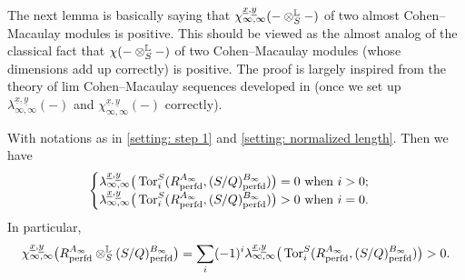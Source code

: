 \documentclass[12pt]{amsart}
\numberwithin{equation}{theorem}
\numberwithin{equation}{theorem}
\newcommand{\perfd}{\textnormal{perfd}}
\begin{document}
The next lemma is basically saying that $\chi_{\infty, \infty}^{\underline{x}, \underline{y}}(- \otimes_S^{\mathbb{L}} -)$ of two almost Cohen--Macaulay modules is positive. This should be viewed as the almost analog of the classical fact that $\chi(- \otimes^{\mathbb{L}}_S -)$ of two Cohen--Macaulay modules (whose dimensions add up correctly) is positive. The proof is largely inspired from the theory of lim Cohen--Macaulay sequences developed in \cite{BhattHochsterMaLimCM2026} (once we set up $\lambda_{\infty, \infty}^{\underline{x}, \underline{y}}(-)$ and $\chi_{\infty, \infty}^{\underline{x}, \underline{y}}(-)$ correctly).

\begin{lemma}
\label{lem: strict positivity}
With notations as in \autoref{setting: step 1} and \autoref{setting: normalized length}. Then we have 
$$
\begin{cases}
\lambda_{\infty, \infty}^{\underline{x}, \underline{y}}\big(\Tor_i^S(R^{A_\infty}_\perfd, (S/Q)^{B_\infty}_\perfd)\big)  =0 \text{ when $i>0$;}\\
\lambda_{\infty, \infty}^{\underline{x}, \underline{y}}\big(\Tor_i^S(R^{A_\infty}_\perfd, (S/Q)^{B_\infty}_\perfd)\big)  >0 \text{ when $i=0$.}
\end{cases}
$$
In particular,
$$\chi_{\infty, \infty}^{\underline{x}, \underline{y}}\big(R^{A_\infty}_\perfd \otimes^\myL_S(S/Q)^{B_\infty}_\perfd\big) = \sum_i(-1)^i\lambda_{\infty, \infty}^{\underline{x}, \underline{y}}\big(\Tor_i^S(R^{A_\infty}_\perfd, (S/Q)^{B_\infty}_\perfd)\big) >0.$$
\end{lemma}
\end{document}
